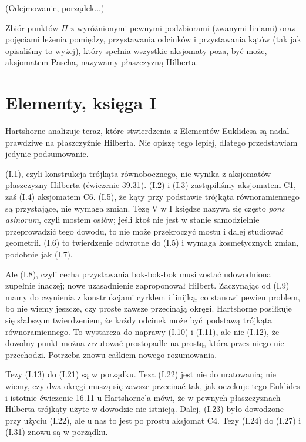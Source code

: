 \documentclass{parchment}
\begin{document}
(Odejmowanie, porządek...)

\begin{definition}
	Zbiór punktów $\Pi$ z wyróżnionymi pewnymi podzbiorami (zwanymi liniami) oraz pojęciami leżenia pomiędzy, przystawania odcinków i przystawania kątów (tak jak opisaliśmy to wyżej), który spełnia wszystkie aksjomaty poza, być może, aksjomatem Pascha, nazywamy płaszczyzną Hilberta.
\end{definition}

\section{Elementy, księga I}
Hartshorne analizuje teraz, które stwierdzenia z Elementów Euklidesa są nadal prawdziwe na płaszczyźnie Hilberta.
Nie opiszę tego lepiej, dlatego przedstawiam jedynie podsumowanie.

(I.1), czyli konstrukcja trójkąta równobocznego, nie wynika z aksjomatów płaszczyzny Hilberta (ćwiczenie 39.31).
(I.2) i (I.3) zastąpiliśmy aksjomatem C1, zaś (I.4) aksjomatem C6.
(I.5), że kąty przy podstawie trójkąta równoramiennego są przystające, nie wymaga zmian.
Tezę V w I księdze nazywa się często \emph{pons asinorum}, czyli mostem osłów; jeśli ktoś nie jest w stanie samodzielnie przeprowadzić tego dowodu, to nie może przekroczyć mostu i dalej studiować geometrii.
%
%
(I.6) to twierdzenie odwrotne do (I.5) i wymaga kosmetycznych zmian, podobnie jak (I.7).

Ale (I.8), czyli cecha przystawania bok-bok-bok musi zostać udowodniona zupełnie inaczej; nowe uzasadnienie zaproponował Hilbert.
Zaczynając od (I.9) mamy do czynienia z konstrukcjami cyrklem i linijką, co stanowi pewien problem, bo nie wiemy jeszcze, czy proste zawsze przecinają okręgi.
Hartshorne posiłkuje się słabszym twierdzeniem, że każdy odcinek może być podstawą trójkąta równoramiennego.
To wystarcza do naprawy (I.10) i (I.11), ale nie (I.12), że dowolny punkt można zrzutować prostopadle na prostą, która przez niego nie przechodzi.
Potrzeba znowu całkiem nowego rozumowania.

Tezy (I.13) do (I.21) są w porządku.
Teza (I.22) jest nie do uratowania; nie wiemy, czy dwa okręgi muszą się zawsze przecinać tak, jak oczekuje tego Euklides i istotnie ćwiczenie 16.11 u Hartshorne'a mówi, że w pewnych płaszczyznach Hilberta trójkąty użyte w dowodzie nie istnieją.
Dalej, (I.23) było dowodzone przy użyciu (I.22), ale u nas to jest po prostu aksjomat C4.
Tezy (I.24) do (I.27) i (I.31) znowu są w porządku.
\end{document}
